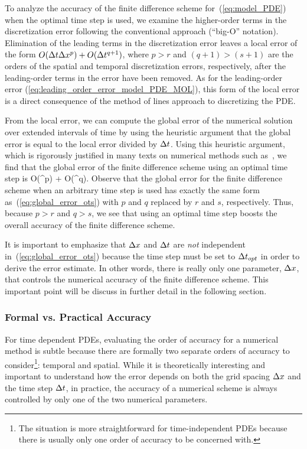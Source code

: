 \documentclass[oneeqnum,onefignum,onetabnum,onethmnum]{siamltex}
\begin{document}
To analyze the accuracy of the finite difference scheme 
for~(\ref{eq:model_PDE}) when the optimal time step is used, we examine the 
higher-order terms in the discretization error following the conventional 
approach (\ie ``big-O'' notation).  Elimination of the leading terms in the 
discretization error leaves a local error of the form 
$O(\Delta t \Delta x^p) + O(\Delta t^{q+1})$, where $p>r$ and $(q+1) > (s+1)$ are the orders 
of the spatial and temporal discretization errors, respectively, after the 
leading-order terms in the error have been removed.  As for the leading-order 
error (\ref{eq:leading_order_error_model_PDE_MOL}), this form of the local 
error is a direct consequence of the method of lines approach to discretizing 
the PDE.  

From the local error, we can compute the global error of the numerical 
solution over extended intervals of time by using the heuristic argument
that the global error is equal to the local error divided by $\Delta t$.  Using 
this heuristic argument, which is rigorously justified in many texts on 
numerical methods such as~\cite{gko_book}, we find that the global error of 
the finite difference scheme using an optimal time step is 
\beq
O(\dx^p) + O(\dt^q).
\label{eq:global_error_ots}
\eeq
Observe that the global error for the finite difference scheme when an 
arbitrary time step is used has exactly the same form 
as~(\ref{eq:global_error_ots}) with $p$ and $q$ replaced by $r$ and $s$, 
respectively.  Thus, because $p > r$ and $q > s$, we see that using an optimal 
time step boosts the overall accuracy of the finite difference scheme.  

It is important to emphasize that $\Delta x$ and $\Delta t$ are \emph{not} independent 
in~(\ref{eq:global_error_ots}) because the time step must be set to $\Delta t_{opt}$ 
in order to derive the error estimate.  In other words, there is really only 
one parameter, $\Delta x$, that controls the numerical accuracy of the finite 
difference scheme.  This important point will be discuss in further detail in 
the following section.


\subsubsection*{Formal vs. Practical Accuracy}
For time dependent PDEs, evaluating the order of accuracy for a numerical
method is subtle because there are formally two separate orders of accuracy 
to consider\footnote{The situation is more straightforward for 
time-independent PDEs because there is usually only one order of accuracy to 
be concerned with.}:  temporal and spatial.  While it is theoretically
interesting and important to understand how the error depends on both the 
grid spacing $\Delta x$ and the time step $\Delta t$, in practice, the accuracy 
of a numerical scheme is always controlled by only one of the two numerical
parameters.  
\end{document}
